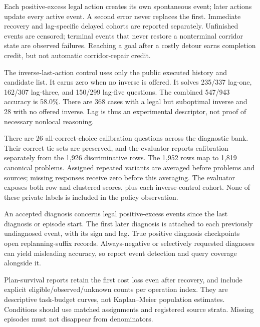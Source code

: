 Each positive-excess legal action creates its own spontaneous event;
later actions update every active event. A second error never replaces
the first. Immediate recovery and lag-specific delayed cohorts are
reported separately. Unfinished events are censored; terminal events
that never restore a nonterminal corridor state are observed failures.
Reaching a goal after a costly detour earns completion credit, but not
automatic corridor-repair credit.

The inverse-last-action control uses only the public executed history
and candidate list. It earns zero when no inverse is offered. It solves
235/337 lag-one, 162/307 lag-three, and 150/299 lag-five questions.
The combined 547/943 accuracy is 58.0\%. There are 368 cases with a legal
but suboptimal inverse and 28 with no offered inverse. Lag is thus an
experimental descriptor, not proof of necessary nonlocal reasoning.

There are 26 all-correct-choice calibration questions across the
diagnostic bank. Their correct tie sets are preserved, and the evaluator
reports calibration separately from the 1,926 discriminative rows.
The 1,952 rows map to 1,819 canonical problems. Assigned repeated variants
are averaged before problems and sources; missing responses receive
zero before this averaging. The evaluator exposes both row and clustered
scores, plus each inverse-control cohort. None of these private labels
is included in the policy observation.

An accepted diagnosis concerns legal positive-excess events since the
last diagnosis or episode start. The first later diagnosis is attached
to each previously undiagnosed event, with its sign and lag. True
positive diagnosis checkpoints open replanning-suffix records.
Always-negative or selectively requested diagnoses can yield misleading
accuracy, so report event detection and query coverage alongside it.

Plan-survival reports retain the first cost loss even after recovery,
and include explicit eligible/observed/unknown counts per operation index.
They are descriptive task-budget curves, not Kaplan--Meier population
estimates. Conditions should use matched assignments and registered
source strata. Missing episodes must not disappear from denominators.

